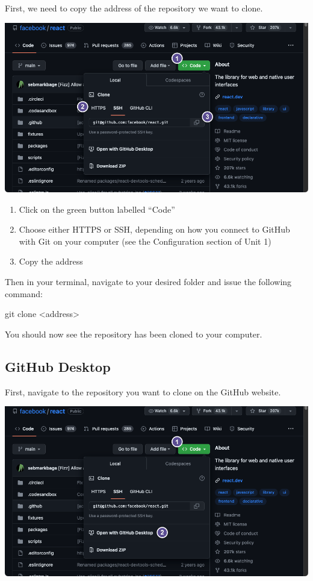 \documentclass[
  letterpaper,
  DIV=11,
  numbers=noendperiod]{scrartcl}
\newenvironment{Shaded}{\begin{snugshade}}{\end{snugshade}}
\newcommand{\FunctionTok}[1]{\textcolor[rgb]{0.28,0.35,0.67}{#1}}
\newcommand{\NormalTok}[1]{\textcolor[rgb]{0.00,0.23,0.31}{#1}}
\newcommand{\OperatorTok}[1]{\textcolor[rgb]{0.37,0.37,0.37}{#1}}
\begin{document}
First, we need to copy the address of the repository we want to clone.

\includegraphics{images/image23.png}

\begin{enumerate}
\def\labelenumi{\arabic{enumi}.}
\item
  Click on the green button labelled ``Code''
\item
  Choose either HTTPS or SSH, depending on how you connect to GitHub
  with Git on your computer (see the Configuration section of Unit 1)
\item
  Copy the address
\end{enumerate}

Then in your terminal, navigate to your desired folder and issue the
following command:

\begin{Shaded}
\begin{Highlighting}[]
\FunctionTok{git}\NormalTok{ clone }\OperatorTok{\textless{}}\NormalTok{address}\OperatorTok{\textgreater{}}
\end{Highlighting}
\end{Shaded}

You should now see the repository has been cloned to your computer.

\subsection{GitHub Desktop}

First, navigate to the repository you want to clone on the GitHub
website.

\includegraphics{images/image24.png}
\end{document}
